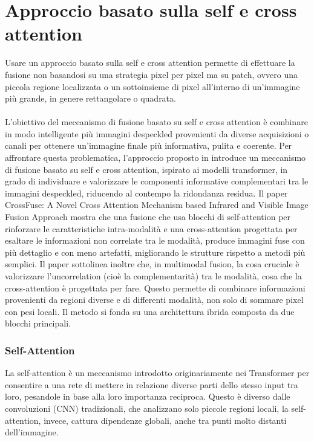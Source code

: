 

\chapter{Approccio basato sulla self e cross attention}
Usare un approccio basato sulla self e cross attention permette di effettuare la fusione non basandosi su una strategia 
pixel per pixel ma su patch, ovvero 
una piccola regione localizzata o un sottoinsieme di pixel all'interno di 
un'immagine più grande, in genere rettangolare o quadrata. \\\\
L’obiettivo del meccanismo di fusione basato su self e cross attention è combinare 
in modo intelligente più immagini despeckled provenienti da diverse acquisizioni o canali per ottenere un’immagine finale più informativa, pulita e coerente. 
Per affrontare questa problematica, l’approccio proposto in \cite{li2024crossfuse} introduce un meccanismo di fusione basato su self e cross attention, ispirato ai modelli 
transformer, in grado di individuare e valorizzare le componenti informative complementari tra le immagini despeckled, riducendo al contempo la ridondanza residua.
Il paper CrossFuse: A Novel Cross Attention Mechanism based Infrared and Visible Image Fusion Approach mostra che una 
fusione che usa blocchi di self-attention per rinforzare le caratteristiche intra-modalità  
e una cross-attention progettata per esaltare le informazioni non correlate tra le modalità, produce immagini 
fuse con più dettaglio e con meno artefatti, migliorando le strutture rispetto a metodi più semplici. 
Il paper sottolinea inoltre che, in multimodal fusion, la cosa cruciale è valorizzare l’uncorrelation (cioè la complementarità) tra le modalità, 
cosa che la cross-attention è progettata per fare. Questo permette di combinare 
informazioni provenienti da regioni diverse e di differenti modalità, non solo di sommare pixel con pesi locali. 
Il metodo si fonda su una architettura ibrida composta da due blocchi principali.
\subsection{Self-Attention}
La self-attention è un meccanismo introdotto originariamente nei Transformer per consentire a 
una rete di mettere in relazione diverse parti dello stesso input tra loro, pesandole in base alla loro importanza reciproca.
Questo è diverso dalle convoluzioni (CNN) tradizionali, che analizzano solo piccole regioni locali, la self-attention, invece, 
cattura dipendenze globali, anche tra punti molto distanti dell’immagine.
